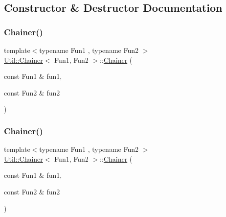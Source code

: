 \subsection{Constructor \& Destructor Documentation}
\mbox{\label{classUtil_1_1Chainer_a326196e6b1b7c50ca66c8930d2274007}} 
\subsubsection{\texorpdfstring{Chainer()}{Chainer()}\hspace{0.1cm}{\footnotesize\ttfamily [1/3]}}
{\footnotesize\ttfamily template$<$typename Fun1 , typename Fun2 $>$ \\
\mbox{\hyperlink{classUtil_1_1Chainer}{Util\+::\+Chainer}}$<$ Fun1, Fun2 $>$\+::\mbox{\hyperlink{classUtil_1_1Chainer}{Chainer}} (\begin{DoxyParamCaption}\item[{const Fun1 \&}]{fun1,  }\item[{const Fun2 \&}]{fun2 }\end{DoxyParamCaption})\hspace{0.3cm}{\ttfamily [inline]}}

\mbox{\label{classUtil_1_1Chainer_a326196e6b1b7c50ca66c8930d2274007}} 
\subsubsection{\texorpdfstring{Chainer()}{Chainer()}\hspace{0.1cm}{\footnotesize\ttfamily [2/3]}}
{\footnotesize\ttfamily template$<$typename Fun1 , typename Fun2 $>$ \\
\mbox{\hyperlink{classUtil_1_1Chainer}{Util\+::\+Chainer}}$<$ Fun1, Fun2 $>$\+::\mbox{\hyperlink{classUtil_1_1Chainer}{Chainer}} (\begin{DoxyParamCaption}\item[{const Fun1 \&}]{fun1,  }\item[{const Fun2 \&}]{fun2 }\end{DoxyParamCaption})\hspace{0.3cm}{\ttfamily [inline]}}

